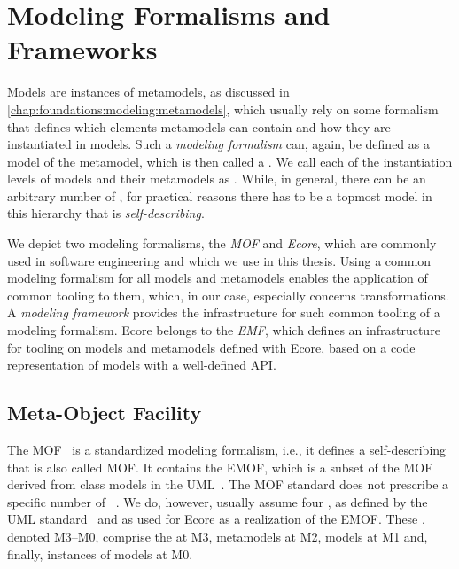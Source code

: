 \section{Modeling Formalisms and Frameworks}
\label{chap:foundations:formalisms}

Models are instances of metamodels, as discussed in \autoref{chap:foundations:modeling:metamodels}, which usually rely on some formalism that defines which elements metamodels can contain and how they are instantiated in models.
Such a \emph{modeling formalism} can, again, be defined as a model of the metamodel, which is then called a \emph{\metametamodel}.
We call each of the instantiation levels of models and their metamodels as \emph{\metalevels}.
While, in general, there can be an arbitrary number of \metalevels, for practical reasons there has to be a topmost model in this hierarchy that is \emph{self-describing}.

We depict two modeling formalisms, the \emph{\acrlong{MOF}} and \emph{Ecore}, which are commonly used in software engineering and which we use in this thesis.
Using a common modeling formalism for all models and metamodels enables the application of common tooling to them, which, in our case, especially concerns transformations.
A \emph{modeling framework} provides the infrastructure for such common tooling of a modeling formalism.
Ecore belongs to the \emph{\acrlong{EMF}}, which defines an infrastructure for tooling on models and metamodels defined with Ecore, based on a code representation of models with a well-defined \gls{API}.


\subsection{Meta-Object Facility}
\label{chap:foundations:formalisms:mof}

The \gls{MOF}~\cite{mof} is a standardized modeling formalism, i.e., it defines a self-describing \metametamodel that is also called \gls{MOF}.
It contains the \gls{EMOF}, which is a subset of the \gls{MOF} derived from class models in the \gls{UML}~\cite{uml}.
The \gls{MOF} standard does not prescribe a specific number of \metalevels~\cite[Sec.~7.3]{mof}.
We do, however, usually assume four \metalevels, as defined by the \gls{UML} standard~\cite{uml} and as used for Ecore as a realization of the \gls{EMOF}.
These \metalevels, denoted M3--M0, comprise the \metametamodel at M3, metamodels at M2, models at M1 and, finally, instances of models at M0.

